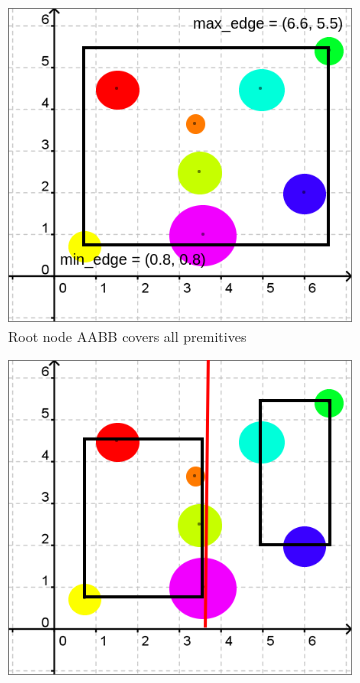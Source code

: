 \documentclass[11pt,a4paper]{article}
\begin{document}
\begin{figure}[h]	
     \centering
     \begin{subfigure}[b]{0.3\textwidth}
         \centering
         \includegraphics[width=\textwidth]{images/example_bvh/2.png}
         \caption{Root node AABB covers all premitives}
         \label{fig:pi_4000}
     \end{subfigure}
     \hfill
     \begin{subfigure}[b]{0.3\textwidth}
         \centering
         \includegraphics[width=\textwidth]{images/example_bvh/3.png}

\end{subfigure}
\end{figure}
\end{document}
